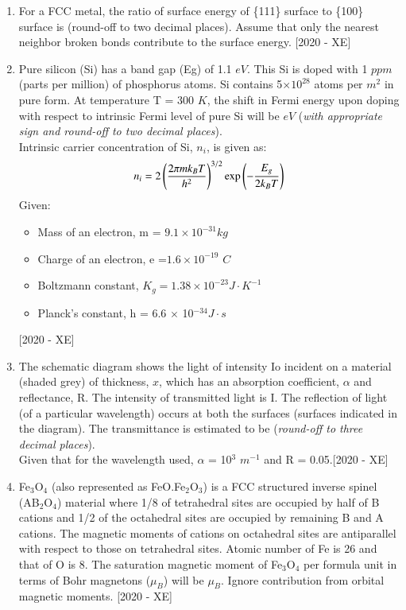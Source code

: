 \documentclass[journal]{IEEEtran}
\begin{document}
\begin{enumerate}
    \item For a FCC metal, the ratio of surface energy of \{111\} surface to \{100\} surface is \underline{\hspace{3cm}} (round-off to two decimal places). Assume that only the nearest neighbor broken bonds contribute to the surface energy. \hfill{[2020 - XE]}
    \item  Pure silicon (Si) has a band gap (Eg) of 1.1 $eV$. This Si is doped with 1 $ppm$ (parts per million) of phosphorus atoms. Si contains 5$\times 10^{28}$ atoms per $m^2$ in pure form. At temperature T = 300 $K$, the shift in Fermi energy upon doping with respect to intrinsic Fermi level of pure Si will be \underline{\hspace{3cm}} $eV$ (\textit{with appropriate sign and round-off to two decimal places}).\\
    Intrinsic carrier concentration of Si, $n_i$, is given as:
    $$n_i = 2\left(\frac{2\pi mk_B T}{h^2}\right)^{3/2} \exp\left(-\frac{E_g}{2k_B T}\right)$$
    Given:
    \begin{itemize}
        \item Mass of an electron, m = $9.1 \times 10^{-31} kg$
        \item Charge of an electron, e =$1.6 \times 10^{-19}$ $C$
        \item Boltzmann constant, $K_g = 1.38 \times 10^{-23} J\cdot K^{-1}$
        \item Planck's constant, h = 6.6 $\times$ 10$^{-34} J\cdot s$
    \end{itemize}\hfill{[2020 - XE]}
    \item The schematic diagram shows the light of intensity Io incident on a material (shaded grey) of thickness, $x$, which has an absorption coefficient, $\alpha$ and reflectance, R. The intensity of transmitted light is I. The reflection of light (of a particular wavelength) occurs at both the surfaces (surfaces indicated in the diagram). The transmittance is estimated to be \underline{\hspace{3cm}} (\textit{round-off to three decimal places}).\\
    Given that for the wavelength used, $\alpha$ = 10$^3$ $m^{-1}$ and R = 0.05.\hfill{[2020 - XE]}
    
    \item Fe$_3$O$_4$ (also represented as FeO.Fe$_2$O$_3$) is a FCC structured inverse spinel (AB$_2$O$_4$) material where 1/8 of tetrahedral sites are occupied by half of B cations and 1/2 of the octahedral sites are occupied by remaining B and A cations. The magnetic moments of cations on octahedral sites are antiparallel with respect to those on tetrahedral sites. Atomic number of Fe is 26 and that of O is 8. The saturation magnetic moment of Fe$_3$O$_4$ per formula unit in terms of Bohr magnetons ($\mu_B$) will be \underline{\hspace{3cm}} $\mu_B$. Ignore contribution from orbital magnetic moments. \hfill{[2020 - XE]}

\end{enumerate}
\end{document}
